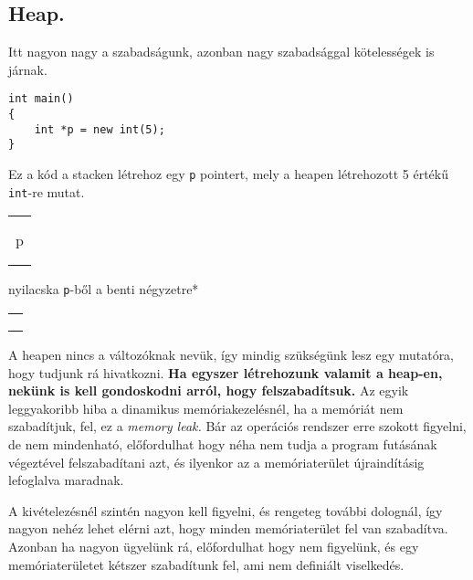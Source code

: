 \documentclass[a4paper,11.5pt]{article}
\begin{document}
	\subsection{Heap.}
	Itt nagyon nagy a szabadságunk, azonban nagy szabadsággal kötelességek is járnak.
	\begin{lstlisting}
int main()
{
	int *p = new int(5);
}
	\end{lstlisting}
	Ez a kód a stacken létrehoz egy \texttt{p} pointert, mely a heapen létrehozott 5 értékű \texttt{int}-re mutat.
	\begin{center}
		
		\begin{tabular}{|c|}
			\\
			\\
			\quad \quad \quad \quad \quad \\
			p\\
			\\
			\\
			\hline
		\end{tabular}\quad*nyilacska \texttt{p}-ből a benti négyzetre*
		\begin{tabular}{|c|}
			\hline
			\quad \quad\quad \quad \quad \quad  \\
			\quad \quad \fbox{5}\\
			\\
			\hline
		\end{tabular}
	\end{center}
	A heapen nincs a változóknak nevük, így mindig szükségünk lesz egy mutatóra, hogy tudjunk rá hivatkozni. \textbf{Ha egyszer létrehozunk valamit a heap-en, nekünk is kell gondoskodni arról, hogy felszabadítsuk.} Az egyik leggyakoribb hiba a dinamikus memóriakezelésnél, ha a memóriát nem szabadítjuk, fel, ez a \textit{memory leak.} Bár az operációs rendszer erre szokott figyelni, de nem mindenható, előfordulhat hogy néha nem tudja a program futásának végeztével felszabadítani azt, és ilyenkor az a memóriaterület újraindításig lefoglalva maradnak.
	\medskip
	
	A kivételezésnél szintén nagyon kell figyelni, és rengeteg további dolognál, így nagyon nehéz lehet elérni azt, hogy minden memóriaterület fel van szabadítva. Azonban ha nagyon ügyelünk rá, előfordulhat hogy nem figyelünk, és egy memóriaterületet kétszer szabadítunk fel, ami nem definiált viselkedés.
	\medskip
	
\end{document}
